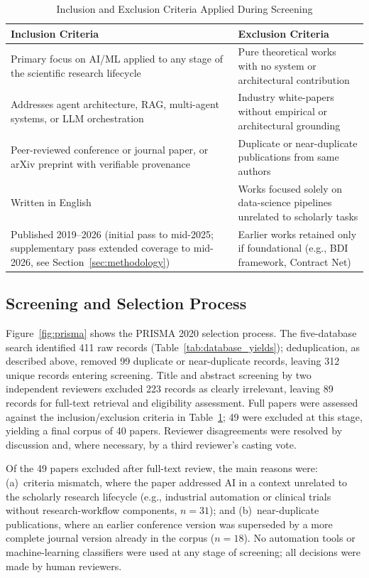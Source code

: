 \documentclass[sn-basic,Numbered]{sn-jnl}
\begin{document}
\begin{table}[h]
\centering
\caption{Inclusion and Exclusion Criteria Applied During Screening}
\label{tab:criteria}
\renewcommand{\arraystretch}{1.2}
\begin{tabularx}{\columnwidth}{|X|X|}
\hline
\textbf{Inclusion Criteria} & \textbf{Exclusion Criteria} \\
\hline
Primary focus on AI/ML applied to any stage of the scientific research
lifecycle &
Pure theoretical works with no system or architectural contribution \\
\hline
Addresses agent architecture, RAG, multi-agent systems, or LLM
orchestration &
Industry white-papers without empirical or architectural grounding \\
\hline
Peer-reviewed conference or journal paper, or arXiv preprint with
verifiable provenance &
Duplicate or near-duplicate publications from same authors \\
\hline
Written in English &
Works focused solely on data-science pipelines unrelated to scholarly
tasks \\
\hline
Published 2019--2026 (initial pass to mid-2025; supplementary pass
extended coverage to mid-2026, see Section~\ref{sec:methodology}) &
Earlier works retained only if foundational
(e.g., BDI framework, Contract Net) \\
\hline
\end{tabularx}
\end{table}

\subsection{Screening and Selection Process}

Figure~\ref{fig:prisma} shows the PRISMA 2020 selection process. The
five-database search identified 411 raw records
(Table~\ref{tab:database_yields}); deduplication, as described above,
removed 99 duplicate or near-duplicate records, leaving 312 unique
records entering screening. Title and abstract screening by two
independent reviewers excluded 223 records as clearly irrelevant,
leaving 89 records for full-text retrieval and eligibility assessment.
Full papers were assessed against the inclusion/exclusion criteria in
Table~\ref{tab:criteria}; 49 were excluded at this stage, yielding a
final corpus of 40 papers. Reviewer disagreements were resolved by
discussion and, where necessary, by a third reviewer's casting vote.

Of the 49 papers excluded after full-text review, the main reasons
were: (a)~criteria mismatch, where the paper addressed AI in a context
unrelated to the scholarly research lifecycle (e.g., industrial
automation or clinical trials without research-workflow components,
$n=31$); and (b)~near-duplicate publications, where an earlier
conference version was superseded by a more complete journal version
already in the corpus ($n=18$). No automation tools or machine-learning
classifiers were used at any stage of screening; all decisions were
made by human reviewers.
\end{document}
